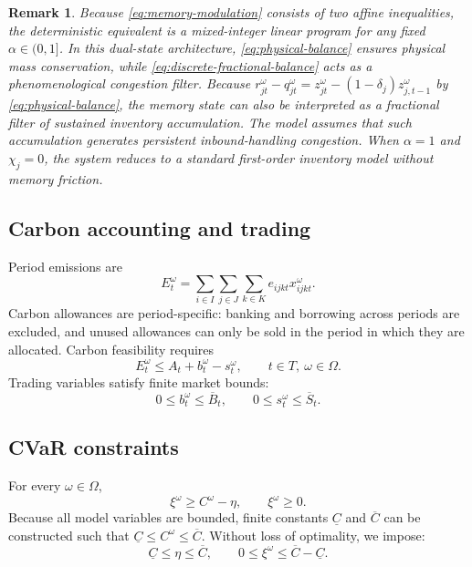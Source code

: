 \documentclass[11pt,a4paper]{article}
\newtheorem{remark}{Remark}
\begin{document}
\begin{remark}
Because \cref{eq:memory-modulation} consists of two affine inequalities,
the deterministic equivalent is a mixed-integer linear program for any
fixed \(\alpha\in(0,1]\). In this dual-state architecture,
\cref{eq:physical-balance} ensures physical mass conservation, while
\cref{eq:discrete-fractional-balance} acts as a phenomenological
congestion filter. Because
\(r_{jt}^{\omega}-q_{jt}^{\omega}=z_{jt}^{\omega}-(1-\delta_j)z_{j,t-1}^{\omega}\)
by \cref{eq:physical-balance}, the memory state can also be interpreted
as a fractional filter of sustained inventory accumulation. The model
assumes that such accumulation generates persistent inbound-handling
congestion. When \(\alpha=1\) and \(\chi_j=0\), the system reduces
to a standard first-order inventory model without memory friction.
\end{remark}

\subsection{Carbon accounting and trading}

Period emissions are
\begin{equation}
  E_t^\omega
  =
  \sum_{i\in I}
  \sum_{j\in J}
  \sum_{k\in K}
  e_{ijkt}x_{ijkt}^{\omega}.
  \label{eq:emissions}
\end{equation}
Carbon allowances are period-specific: banking and borrowing across
periods are excluded, and unused allowances can only be sold in the
period in which they are allocated. Carbon feasibility requires
\begin{equation}
  E_t^\omega
  \leq
  A_t+b_t^\omega-s_t^\omega,
  \qquad
  t\in T,\ \omega\in\Omega.
  \label{eq:carbon-balance}
\end{equation}
Trading variables satisfy finite market bounds:
\begin{equation}
  0\leq b_t^\omega\leq\overline B_t,
  \qquad
  0\leq s_t^\omega\leq\overline S_t.
  \label{eq:trading-bounds}
\end{equation}

\subsection{CVaR constraints}

For every \(\omega\in\Omega\),
\begin{equation}
  \xi^\omega\geq C^\omega-\eta,
  \qquad
  \xi^\omega\geq0.
  \label{eq:cvar-constraints}
\end{equation}
Because all model variables are bounded, finite constants
\(\underline{C}\) and \(\overline{C}\) can be constructed such that
\(\underline{C}\leq C^\omega\leq\overline{C}\). Without loss of
optimality, we impose:
\begin{equation}
  \underline{C}\leq\eta\leq\overline{C},
  \qquad
  0\leq\xi^\omega\leq\overline{C}-\underline{C}.
  \label{eq:cvar-bounds}
\end{equation}
\end{document}
